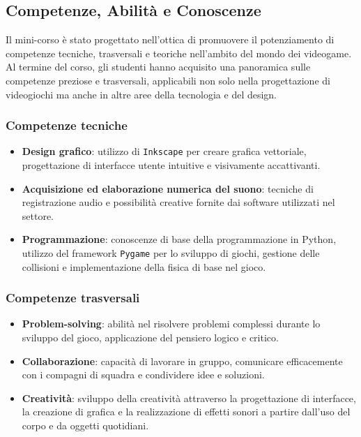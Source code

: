 \documentclass{easychair}
\begin{document}
\subsection{Competenze, Abilità e Conoscenze}
Il mini-corso è stato progettato nell'ottica di promuovere il potenziamento di competenze tecniche, trasversali e teoriche nell'ambito del mondo dei videogame. Al termine del corso, gli studenti hanno acquisito una panoramica sulle competenze preziose e trasversali, applicabili non solo nella progettazione di videogiochi ma anche in altre aree della tecnologia e del design.

\subsubsection{Competenze tecniche}
\begin{itemize}
    \item \textbf{Design grafico}: utilizzo di \texttt{Inkscape} per creare grafica vettoriale, progettazione di interfacce utente intuitive e visivamente accattivanti.
    \item \textbf{Acquisizione ed elaborazione numerica del suono}: tecniche di registrazione audio e possibilità creative fornite dai software utilizzati nel settore.
    \item \textbf{Programmazione}: conoscenze di base della programmazione in Python, utilizzo del framework \texttt{Pygame} per lo sviluppo di giochi, gestione delle collisioni e implementazione della fisica di base nel gioco.
\end{itemize}
\subsubsection{Competenze trasversali}
\begin{itemize}
    \item \textbf{Problem-solving}: abilità nel risolvere problemi complessi durante lo sviluppo del gioco, applicazione del pensiero logico e critico.
    \item \textbf{Collaborazione}: capacità di lavorare in gruppo, comunicare efficacemente con i compagni di squadra e condividere idee e soluzioni.
    \item \textbf{Creatività}: sviluppo della creatività attraverso la progettazione di interfacce, la creazione di grafica e la realizzazione di effetti sonori a partire dall'uso del corpo e da oggetti quotidiani.
\end{itemize}
\end{document}
